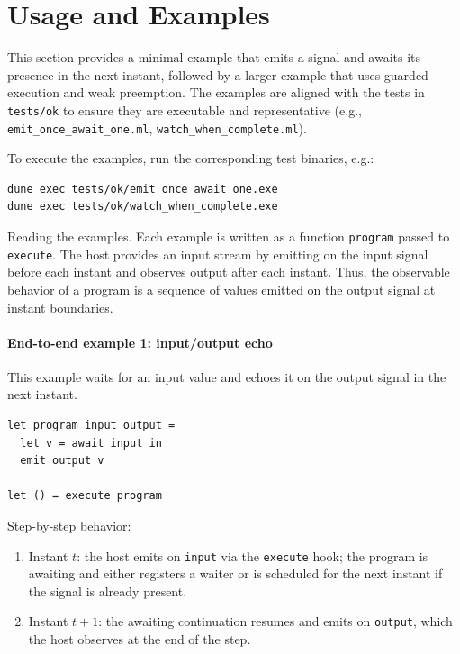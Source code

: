 \section{Usage and Examples}
This section provides a minimal example that emits a signal and awaits its
presence in the next instant, followed by a larger example that uses guarded
execution and weak preemption. The examples are aligned with the tests in
\texttt{tests/ok} to ensure they are executable and representative (e.g.,
\texttt{emit\_once\_await\_one.ml}, \texttt{watch\_when\_complete.ml}).

To execute the examples, run the corresponding test binaries, e.g.:
\begin{lstlisting}[style=tempo]
dune exec tests/ok/emit_once_await_one.exe
dune exec tests/ok/watch_when_complete.exe
\end{lstlisting}

Reading the examples. Each example is written as a function \texttt{program}
passed to \texttt{execute}. The host provides an input stream by emitting on
the input signal before each instant and observes output after each instant.
Thus, the observable behavior of a program is a sequence of values emitted on
the output signal at instant boundaries.

\paragraph{End-to-end example 1: input/output echo}
This example waits for an input value and echoes it on the output signal in the
next instant.
\begin{lstlisting}[style=tempo]
let program input output =
  let v = await input in
  emit output v

let () = execute program
\end{lstlisting}
Step-by-step behavior:
\begin{enumerate}
\item Instant $t$: the host emits on \texttt{input} via the \texttt{execute}
  hook; the program is awaiting and either registers a waiter or is scheduled
  for the next instant if the signal is already present.
\item Instant $t{+}1$: the awaiting continuation resumes and emits on
  \texttt{output}, which the host observes at the end of the step.
\end{enumerate}

